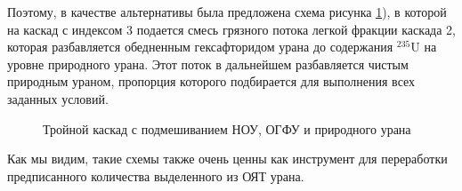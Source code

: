 Поэтому, в качестве альтернативы была предложена схема рисунка \ref{fig:patent}), в которой на каскад с индексом 3 подается смесь грязного потока легкой фракции каскада 2, которая разбавляется обедненным гексафторидом урана до содержания $^{235}$U на уровне природного урана. Этот поток в дальнейшем разбавляется чистым природным ураном, пропорция которого подбирается для выполнения всех заданных условий.
\begin{figure}[ht]
  \caption{Тройной каскад с подмешиванием НОУ, ОГФУ и природного урана}\label{fig:patent}
\end{figure}

Как мы видим, такие схемы также очень ценны как инструмент для переработки предписанного количества выделенного из ОЯТ урана.



